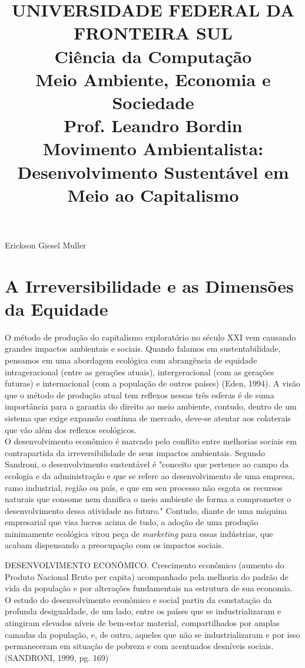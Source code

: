 \documentclass[12pt, a4paper]{article}
\title{UNIVERSIDADE FEDERAL DA FRONTEIRA SUL\\Ciência da Computação\\Meio Ambiente, Economia e Sociedade\\Prof. Leandro Bordin\\ Movimento Ambientalista: Desenvolvimento Sustentável em Meio ao Capitalismo}
\date{}
\newenvironment{citacao}{
  \vspace{0.5cm} %
  \small %
  \begin{list}{}{
    \leftmargin=4cm %
    \rightmargin=0cm
    \parsep=0pt
    \topsep=0pt
    \partopsep=0pt
  }
  \item\relax
  \linespread{1.0}\selectfont %
}{
  \end{list}
  \vspace{0.5cm} %
}
\begin{document}
\maketitle

\begin{flushright}
	Erickson Giesel Muller
\end{flushright}

\section{A Irreversibilidade e as Dimensões da Equidade}

	O método de produção do capitalismo exploratório no século XXI vem causando grandes impactos ambientais e sociais. Quando falamos em sustentabilidade, pensamos em uma abordagem ecológica com abrangência de equidade intrageracional (entre as gerações atuais), intergeracional (com as gerações futuras) e internacional (com a população de outros países) (Eden, 1994). A visão que o método de produção atual tem reflexos nessas três esferas é de suma importância para a garantia do direito ao meio ambiente, contudo, dentro de um sistema que exige expansão contínua de mercado, deve-se atentar aos colaterais que vão além dos reflexos ecológicos.
\\

	O desenvolvimento econômico é marcado pelo conflito entre melhorias sociais em contrapartida da irreversibilidade de seus impactos ambientais. Segundo Sandroni, o desenvolvimento sustentável é "conceito que pertence ao campo da ecologia e da administração e que se refere ao desenvolvimento de uma empresa, ramo industrial, região ou país, e que em seu processo não esgota os recursos naturais que consome nem danifica o meio ambiente de forma a comprometer o desenvolvimento dessa atividade no futuro." Contudo, diante de uma máquina empresarial que visa lucros acima de tudo, a adoção de uma produção minimamente ecológica virou peça de \textit{marketing} para essas indústrias, que acabam dispensando a preocupação com os impactos sociais.

\begin{citacao}
	DESENVOLVIMENTO ECONÔMICO. Crescimento econômico (aumento do Produto Nacional Bruto per capita) acompanhado pela melhoria do padrão de vida da população e por alterações fundamentais na estrutura de sua economia. O estudo do desenvolvimento econômico e social partiu da constatação da profunda desigualdade, de um lado, entre os países que se industrializaram e atingiram elevados níveis de bem-estar material, compartilhados por amplas camadas da população, e, de outro, aqueles que não se industrializaram e por isso permaneceram em situação de pobreza e com acentuados desníveis sociais. (SANDRONI, 1999, pg. 169)
\end{citacao}
\end{document}

